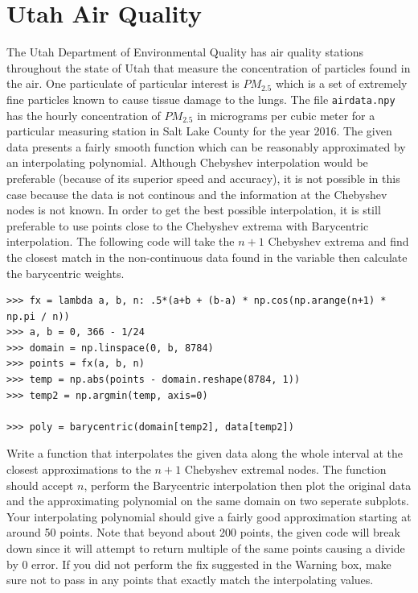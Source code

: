 \section*{Utah Air Quality}
The Utah Department of Environmental Quality has air quality stations throughout the state of Utah that measure the concentration of particles found in the air.
One particulate of particular interest is $PM_{2.5}$ which is a set of extremely fine particles known to cause tissue damage to the lungs.
The file \texttt{airdata.npy} has the hourly concentration of $PM_{2.5}$ in micrograms per cubic meter for a particular measuring station in Salt Lake County for the year 2016.
The given data presents a fairly smooth function which can be reasonably approximated by an interpolating polynomial.
Although Chebyshev interpolation would be preferable (because of its superior speed and accuracy), it is not possible in this case because the data is not continous and the information at the Chebyshev nodes
is not known.
In order to get the best possible interpolation, it is still preferable to use points close to the Chebyshev extrema with Barycentric interpolation.
The following code will take the $n+1$ Chebyshev extrema and find the closest match in the non-continuous data found in the variable  then calculate the barycentric weights.

\begin{lstlisting}
>>> fx = lambda a, b, n: .5*(a+b + (b-a) * np.cos(np.arange(n+1) * np.pi / n))
>>> a, b = 0, 366 - 1/24
>>> domain = np.linspace(0, b, 8784)
>>> points = fx(a, b, n)
>>> temp = np.abs(points - domain.reshape(8784, 1))
>>> temp2 = np.argmin(temp, axis=0)

>>> poly = barycentric(domain[temp2], data[temp2])
\end{lstlisting}

\begin{problem}
Write a function that interpolates the given data along the whole interval at the closest approximations to the $n+1$ Chebyshev extremal nodes.
The function should accept $n$, perform the Barycentric interpolation then plot the original data and the approximating polynomial on the same domain on two seperate subplots.
Your interpolating polynomial should give a fairly good approximation starting at around 50 points.
Note that beyond about 200 points, the given code will break down since it will attempt to return multiple of the same points causing a divide by 0 error.
If you did not perform the fix suggested in the Warning box, make sure not to pass in any points that exactly match the interpolating values.
\end{problem}
\pagebreak



